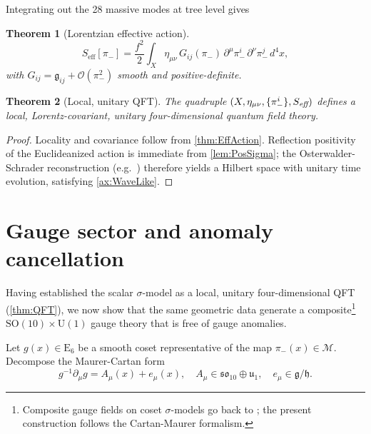 \documentclass[pdflatex,sn-mathphys-num]{sn-jnl}
\theoremstyle{thmstyleone}
\newtheorem{theorem}{Theorem}
\theoremstyle{thmstyletwo}%
\theoremstyle{thmstylethree}%
\newcommand{\SO}[1]{\mathrm{SO(#1)}}
\newcommand{\U}[1]{\mathrm{U(#1)}}
\newcommand{\E}[1]{\mathrm{E_{#1}}}
\newcommand{\SOTen}{\SO{10}}
\newcommand{\UOne}{\U{1}}
\newcommand{\ESix}{\E{6}}
\begin{document}
Integrating out the 28 massive modes at tree level gives

\begin{theorem}[Lorentzian effective action]\label{thm:EffAction}
\[
  S_{\text{eff}}[\pi_-]
  =
  \frac{f^{2}}2
  \int_{X}
     \eta_{\mu\nu}\,
     G_{ij}(\pi_-)\,
     \partial^{\mu}\pi_-^{i}\,
     \partial^{\nu}\pi_-^{j}\,d^{4}x,
\]
with $G_{ij}=\mathfrak g_{ij}+ \mathcal O(\pi_-^{2})$ smooth and
positive-definite.
\end{theorem}

\begin{theorem}[Local, unitary QFT]\label{thm:QFT}
The quadruple
\(
  (X,\eta_{\mu\nu},\{\pi_-^{i}\},S_{\emph{eff}})
\)
defines a local, Lorentz-covariant, unitary four-dimensional quantum
field theory.
\end{theorem}

\begin{proof}
Locality and covariance follow from
\autoref{thm:EffAction}.  Reflection positivity of the Euclideanized
action is immediate from \autoref{lem:PosSigma}; the
Osterwalder-Schrader reconstruction (e.g.\ \cite{GlimmJaffe:1987})
therefore yields a Hilbert space with unitary time evolution, satisfying
\autoref{ax:WaveLike}.
\end{proof}

\section{Gauge sector and anomaly cancellation}
\label{sec:6}
Having established the scalar $\sigma$-model as a local, unitary
four-dimensional QFT (\autoref{thm:QFT}), we now show that the same
geometric data generate a composite\footnote{%
  Composite gauge fields on coset $\sigma$-models go back to
  \cite{CallanColeman:1969}; the present construction follows the
  Cartan-Maurer formalism.} 
\(\SOTen\times \UOne\) gauge theory that is free of gauge anomalies.

Let \(g(x)\in \ESix\) be a smooth coset representative of the map
\(\pi_-(x)\in\mathcal M\).  Decompose the Maurer-Cartan form
\begin{equation}\label{eq:MC}
  g^{-1}\partial_\mu g
  =
  A_\mu(x) + e_\mu(x),
  \quad
  A_\mu\in\mathfrak{so}_{10}\oplus\mathfrak u_{1},\quad
  e_\mu\in\mathfrak g/\mathfrak h .
\end{equation}
\end{document}
